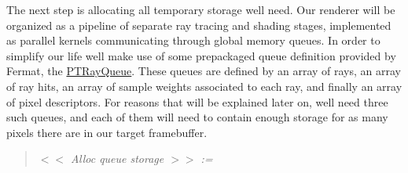 \begin{DoxyParagraph}{}
The next step is allocating all temporary storage we\textquotesingle{}ll need. Our renderer will be organized as a pipeline of separate ray tracing and shading stages, implemented as parallel kernels communicating through global memory queues. In order to simplify our life we\textquotesingle{}ll make use of some prepackaged queue definition provided by Fermat, the \hyperlink{struct_p_t_ray_queue}{P\+T\+Ray\+Queue}. These queues are defined by an array of rays, an array of ray hits, an array of sample weights associated to each ray, and finally an array of pixel descriptors. For reasons that will be explained later on, we\textquotesingle{}ll need three such queues, and each of them will need to contain enough storage for as many pixels there are in our target framebuffer. ~\newline
\label{_hello_renderer_page_Alloc_queue_storage_anchor}%
%
 \begin{quote}
{\itshape  $<$$<$ Alloc queue storage $>$$>$ \+:= }

\end{quote}


\end{DoxyParagraph}
